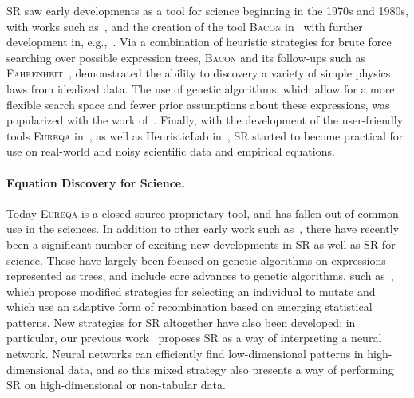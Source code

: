 \documentclass[letterpaper,twocolumn]{scrartcl}
\newcommand\our{our\xspace}
\newcommand\eureqa{\textsc{Eureqa}\xspace}
\newcommand\sr{SR\xspace}
\newcommand\Sr{SR\xspace}
\begin{document}
\Sr saw early developments 
as a tool for science beginning in the 1970s and 1980s, with works such as~\cite{gerwinInformationProcessingData1974}, and the creation of the tool \textsc{Bacon} in~\cite{langleyBACONProductionSystem1977} with further development in, e.g.,~\cite{langleyRediscoveringPhysicsBACON1979,langleyBACONDiscoveryConservation1981}.
Via a combination of heuristic strategies for brute force searching over possible expression trees, \textsc{Bacon} and its follow-ups such as \textsc{Fahrenheit}~\cite{langleyDatadrivenApproachesEmpirical1989}, demonstrated the ability to discovery a variety of simple physics laws from idealized data.
The use of genetic algorithms, which allow for a more flexible search space and fewer prior assumptions about these expressions, was popularized with the work of~\cite{kozaGeneticProgrammingMeans1994}.
Finally, with the development of the user-friendly tools \eureqa in~\cite{bongardCoverAutomatedReverse2007,schmidtDistillingFreeFormNatural2009,schmidtSymbolicRegressionImplicit2010}, as well as HeuristicLab in~\cite{wagnerHeuristicLabGenericExtensible2005}, \sr started to become practical for use on real-world and noisy scientific data and empirical equations.

\paragraph{Equation Discovery for Science.} 
Today \eureqa is a closed-source proprietary tool, and has fallen out of common use in the sciences.
In addition to other early work such as~\cite{debFastElitistNondominated2000,debFastElitistMultiobjective2002,davidsonSymbolicNumericalRegression2003,cranmerPhysicsGPGeneticProgramming2005},
there have recently been a significant number of exciting new developments in \sr as well as \sr for science.
These have largely been focused on genetic algorithms on expressions represented as trees, and include core advances to genetic algorithms, such as~\cite{lacavaEpsilonLexicaseSelectionRegression2016,lacavaProbabilisticMultiobjectiveAnalysis2018}, which propose modified strategies for selecting an individual to mutate and~\cite{virgolinScalableGeneticProgramming2017,virgolinImprovingModelbasedGenetic2021} which use an adaptive form of recombination based on emerging statistical patterns.
New strategies for \sr altogether have also been developed:
in particular, \our previous work~\cite{cranmerLearningSymbolicPhysics2019,cranmerDiscoveringSymbolicModels2020,cranmerDisentangledSparsityNetworks2021} proposes \sr as a way of interpreting a neural network.
Neural networks can efficiently find low-dimensional patterns in high-dimensional data, and so this mixed strategy also presents a way of performing \sr on high-dimensional or non-tabular data.
\end{document}

